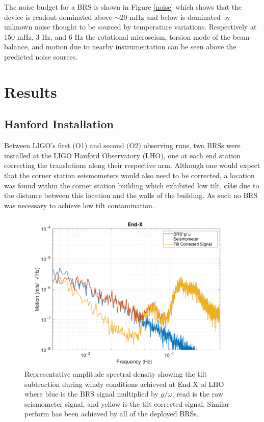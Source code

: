 \documentclass [12pt, proquest]{uwthesis}[2019]
\begin{document}
 The noise budget for a BRS is shown in Figure \ref{noise} which shows that the device is readout dominated above $\sim$20 mHz and below is dominated by unknown noise thought to be sourced by temperature variations. Respectively at 150 mHz, 3 Hz, and 6 Hz the rotational microseism, torsion mode of the beam-balance, and motion due to nearby instrumentation can be seen above the predicted noise sources.

\section{Results}\label{results}
\subsection{Hanford Installation} \label{BRS_Hanford}

\quad Between LIGO's first (O1) and second (O2) observing runs, two BRSs were installed at the LIGO Hanford Observatory (LHO), one at each end station correcting the translations along their respective arm. Although one would expect that the corner station seismometers would also need to be corrected, a location was found within the corner station building which exhibited low tilt, \textbf{cite} due to the distance between this location and the walls of the building. As such no BRS was necessary to achieve low tilt contamination.

\begin{figure}%
\begin{center}
\includegraphics[width=\textwidth]{HSubtractionETMX.pdf}
\caption[Representative amplitude spectral density showing the tilt subtraction during windy conditions]{Representative amplitude spectral density showing the tilt subtraction during windy conditions achieved at End-X of LHO where blue is the BRS signal multiplied by $g/\omega$, read is the raw seismometer signal, and yellow is the tilt corrected signal. Similar perform has been achieved by all of the deployed BRSs.}
\label{sub}
\end{center}
\end{figure}
\end{document}

